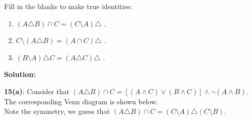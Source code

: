 Fill in the blanks to make true identities:
\begin{enumerate}[label=(\alph*)]
\item $(A \triangle B) \cap C = (C \setminus A) \triangle $ \makebox[1cm]{\hrulefill}.
\item $C \setminus (A \triangle B) = (A \cap C) \triangle $ \makebox[1cm]{\hrulefill}.
\item $(B \setminus A) \triangle C = (A \triangle C) \triangle $ \makebox[1cm]{\hrulefill}.
\end{enumerate}

\textbf{Solution:} 
\

\textbf{15(a)}: Consider that $(A \triangle B) \cap C = [(A \wedge C) \vee (B \wedge C)] \wedge \neg (A \wedge B)$. \\ The corresponding Venn diagram is shown below. \\
Note the symmetry, we guess that $(A \triangle B) \cap C = (C \setminus A) \triangle (C \setminus B)$.

\

\pagebreak

